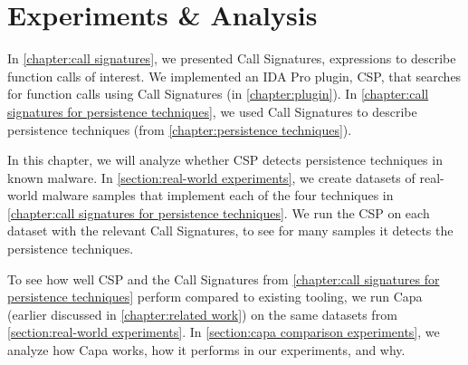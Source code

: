 \chapter{Experiments \& Analysis}\label{chapter:experiments}
In \autoref{chapter:call signatures}, we presented Call Signatures, expressions to describe function calls of interest. We implemented an IDA Pro plugin, CSP, that searches for function calls using Call Signatures (in \autoref{chapter:plugin}). In \autoref{chapter:call signatures for persistence techniques}, we used Call Signatures to describe persistence techniques (from \autoref{chapter:persistence techniques}).

In this chapter, we will analyze whether CSP detects persistence techniques in known malware. In \autoref{section:real-world experiments}, we create datasets of real-world malware samples that implement each of the four techniques in \autoref{chapter:call signatures for persistence techniques}. We run the CSP on each dataset with the relevant Call Signatures, to see for many samples it detects the persistence techniques.

To see how well CSP and the Call Signatures from \autoref{chapter:call signatures for persistence techniques} perform compared to existing tooling, we run Capa (earlier discussed in \autoref{chapter:related work}) on the same datasets from \autoref{section:real-world experiments}. In \autoref{section:capa comparison experiments}, we analyze how Capa works, how it performs in our experiments, and why.



